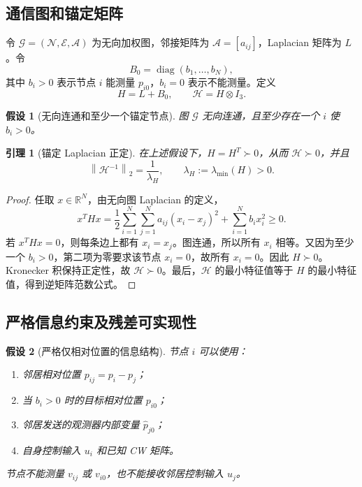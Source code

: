 \documentclass[UTF8,a4paper,12pt]{ctexart}
\newtheorem{assumption}{假设}
\newtheorem{lemma}{引理}
\DeclareMathOperator{\diag}{diag}
\newcommand{\R}{\mathbb{R}}
\newcommand{\norm}[1]{\left\lVert #1\right\rVert}
\newcommand{\cH}{\mathcal H}
\begin{document}
\subsection{通信图和锚定矩阵}

令 $\mathcal G=(\mathcal N,\mathcal E,\mathcal A)$ 为无向加权图，邻接矩阵为 $\mathcal A=[a_{ij}]$，Laplacian 矩阵为 $L$。令
\begin{equation}
  B_0=\diag(b_1,\ldots,b_N),
\end{equation}
其中 $b_i>0$ 表示节点 $i$ 能测量 $p_{i0}$，$b_i=0$ 表示不能测量。定义
\begin{equation}
  H=L+B_0,\qquad \cH=H\otimes I_3.
\label{eq:H-def}
\end{equation}

\begin{assumption}[无向连通和至少一个锚定节点]
图 $\mathcal G$ 无向连通，且至少存在一个 $i$ 使 $b_i>0$。
\end{assumption}

\begin{lemma}[锚定 Laplacian 正定]
在上述假设下，$H=H^T\succ0$，从而 $\cH\succ0$，并且
\begin{equation}
  \norm{\cH^{-1}}_2=\frac{1}{\lambda_H},\qquad
  \lambda_H:=\lambda_{\min}(H)>0.
\end{equation}
\end{lemma}

\begin{proof}
任取 $x\in\R^N$，由无向图 Laplacian 的定义，
\begin{equation}
 x^THx
 =\frac12\sum_{i=1}^N\sum_{j=1}^Na_{ij}(x_i-x_j)^2
 +\sum_{i=1}^Nb_ix_i^2\ge0.
\end{equation}
若 $x^THx=0$，则每条边上都有 $x_i=x_j$。图连通，所以所有 $x_i$ 相等。又因为至少一个 $b_i>0$，第二项为零要求该节点 $x_i=0$，故所有 $x_i=0$。因此 $H\succ0$。Kronecker 积保持正定性，故 $\cH\succ0$。最后，$\cH$ 的最小特征值等于 $H$ 的最小特征值，得到逆矩阵范数公式。
\end{proof}

\subsection{严格信息约束及残差可实现性}

\begin{assumption}[严格仅相对位置的信息结构]
节点 $i$ 可以使用：
\begin{enumerate}[label=(\roman*)]
  \item 邻居相对位置 $p_{ij}=p_i-p_j$；
  \item 当 $b_i>0$ 时的目标相对位置 $p_{i0}$；
  \item 邻居发送的观测器内部变量 $\hat p_{j0}$；
  \item 自身控制输入 $u_i$ 和已知 CW 矩阵。
\end{enumerate}
节点不能测量 $v_{ij}$ 或 $v_{i0}$，也不能接收邻居控制输入 $u_j$。
\end{assumption}
\end{document}
